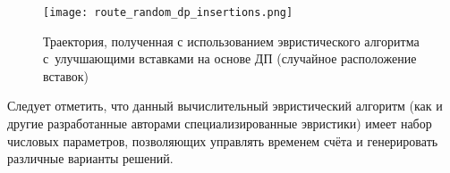 \begin{figure}[H]
  \centering
  \texttt{[image: route\_random\_dp\_insertions.png]}
  \caption{
    Траектория, полученная с использованием эвристического алгоритма
    с~улучшающими вставками на основе ДП (случайное расположение вставок)
  }
  \label{DP_Random_Inserts_Result}
\end{figure}

Следует отметить,
что данный вычислительный эвристический алгоритм
(как и другие разработанные авторами специализированные эвристики)
имеет набор числовых параметров,
позволяющих управлять временем счёта
и генерировать различные варианты решений.
